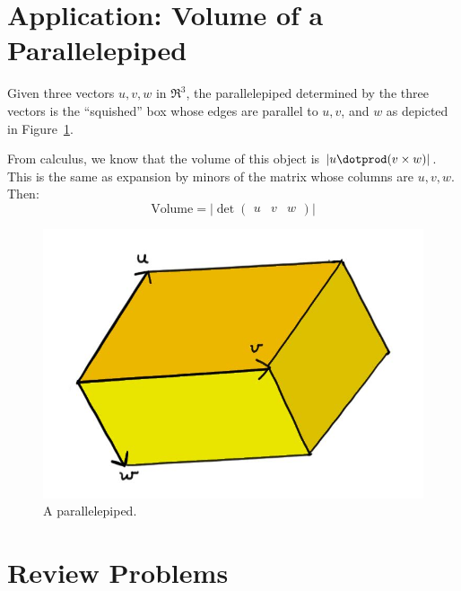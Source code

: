 \section{Application: Volume of a Parallelepiped}

Given three vectors $u,v,w$ in $\Re^3$, the parallelepiped determined by the three vectors is the ``squished'' box whose edges are parallel to $u, v$, and $w$ as depicted in Figure~\ref{parallelepiped}.

From calculus, we know that the volume of this object is $|u\dotprod (v\times w)|$.  This is the same as expansion by minors of the matrix whose columns are $u,v,w$.  Then:
\[
\text{Volume}=\big|\det \begin{pmatrix}u & v & w \end{pmatrix} \big|
\] 



\begin{figure}
\begin{center}
\includegraphics[scale=.4]{parallelepiped.jpg}
\caption{A parallelepiped.\label{parallelepiped}}
\end{center}
\end{figure}







\section{Review Problems}


\newpage




